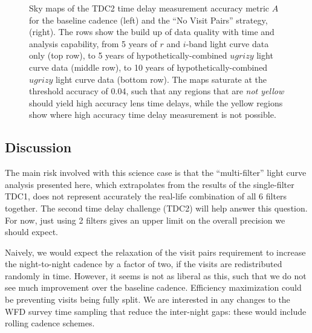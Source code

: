 \begin{figure}[!ht]
\begin{minipage}[b]{\linewidth}
\begin{minipage}[b]{0.48\linewidth}
    \end{minipage}
  \end{minipage}
\caption{Sky maps of the TDC2 time delay measurement accuracy metric $A$ for the baseline cadence  (left) and the ``No Visit Pairs'' strategy,  (right). The rows show the build up of data quality with time and analysis capability, from 5 years of $r$ and $i$-band light curve data only (top row), to 5 years of hypothetically-combined $ugrizy$ light curve data (middle row), to 10 years of hypothetically-combined $ugrizy$ light curve data (bottom row). The maps saturate at the threshold accuracy of 0.04, such that any regions that are {\it not yellow} should yield high accuracy lens time delays, while the yellow regions show where high accuracy time delay measurement is not possible.}
\label{fig:lenstimedelays:accuracymaps}
\end{figure}





\subsection{Discussion}
\label{sec:\secname:discussion}

The main risk involved with this science case is that the
``multi-filter'' light curve analysis presented here, which extrapolates
from the results of the single-filter TDC1, does not represent
accurately the real-life combination of all 6 filters together. The
second time delay challenge (TDC2) will help answer this question.  For
now, just using 2 filters gives an upper limit on the overall precision
we should expect.

Naively, we would expect the relaxation of the visit pairs requirement
to increase the  night-to-night cadence by a factor of two, if the
visits are redistributed randomly in time. However, it seems \OpSim is
not as liberal as this, such that we do not see much improvement over
the baseline cadence. Efficiency maximization could be preventing visits
being fully split. We are interested in any changes to the WFD survey
time sampling that reduce the inter-night gaps: these  would include
rolling cadence schemes.



